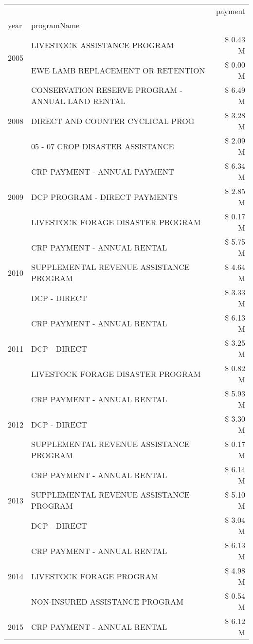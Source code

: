 \begin{tabular}{llr}
\toprule
 &  & payment \\
year & programName &  \\
\midrule
\multirow[t]{2}{*}{2005} & LIVESTOCK ASSISTANCE PROGRAM & \$ 0.43 M \\
 & EWE LAMB REPLACEMENT OR RETENTION & \$ 0.00 M \\
\cline{1-3}
\multirow[t]{3}{*}{2008} & CONSERVATION RESERVE PROGRAM - ANNUAL LAND RENTAL & \$ 6.49 M \\
 & DIRECT AND COUNTER CYCLICAL PROG & \$ 3.28 M \\
 & 05 - 07 CROP DISASTER ASSISTANCE & \$ 2.09 M \\
\cline{1-3}
\multirow[t]{3}{*}{2009} & CRP PAYMENT - ANNUAL PAYMENT & \$ 6.34 M \\
 & DCP PROGRAM - DIRECT PAYMENTS & \$ 2.85 M \\
 & LIVESTOCK FORAGE DISASTER  PROGRAM & \$ 0.17 M \\
\cline{1-3}
\multirow[t]{3}{*}{2010} & CRP PAYMENT - ANNUAL RENTAL & \$ 5.75 M \\
 & SUPPLEMENTAL REVENUE ASSISTANCE PROGRAM & \$ 4.64 M \\
 & DCP - DIRECT & \$ 3.33 M \\
\cline{1-3}
\multirow[t]{3}{*}{2011} & CRP PAYMENT - ANNUAL RENTAL & \$ 6.13 M \\
 & DCP - DIRECT & \$ 3.25 M \\
 & LIVESTOCK FORAGE DISASTER PROGRAM & \$ 0.82 M \\
\cline{1-3}
\multirow[t]{3}{*}{2012} & CRP PAYMENT - ANNUAL RENTAL & \$ 5.93 M \\
 & DCP - DIRECT & \$ 3.30 M \\
 & SUPPLEMENTAL REVENUE ASSISTANCE PROGRAM & \$ 0.17 M \\
\cline{1-3}
\multirow[t]{3}{*}{2013} & CRP PAYMENT - ANNUAL RENTAL & \$ 6.14 M \\
 & SUPPLEMENTAL REVENUE ASSISTANCE PROGRAM & \$ 5.10 M \\
 & DCP - DIRECT & \$ 3.04 M \\
\cline{1-3}
\multirow[t]{3}{*}{2014} & CRP PAYMENT - ANNUAL RENTAL & \$ 6.13 M \\
 & LIVESTOCK FORAGE PROGRAM & \$ 4.98 M \\
 & NON-INSURED ASSISTANCE PROGRAM & \$ 0.54 M \\
\cline{1-3}
\multirow[t]{3}{*}{2015} & CRP PAYMENT - ANNUAL RENTAL & \$ 6.12 M \\

\end{tabular}
